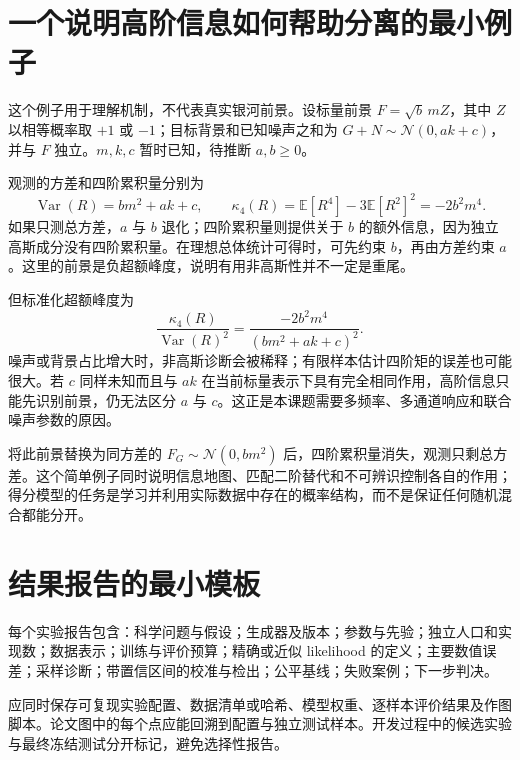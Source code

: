 \documentclass[UTF8,fontset=fandol,a4paper,11pt]{ctexart}
\numberwithin{equation}{section}
\newcommand{\E}{\mathbb E}
\newcommand{\Normal}{\mathcal N}
\begin{document}
\section{一个说明高阶信息如何帮助分离的最小例子}
这个例子用于理解机制，不代表真实银河前景。设标量前景 $F=\sqrt b\,mZ$，其中 $Z$ 以相等概率取 $+1$ 或 $-1$；目标背景和已知噪声之和为 $G+N\sim\Normal(0,ak+c)$，并与 $F$ 独立。$m,k,c$ 暂时已知，待推断 $a,b\geq0$。

观测的方差和四阶累积量分别为
\begin{equation}
\operatorname{Var}(R)=bm^2+ak+c,\qquad
\kappa_4(R)=\E[R^4]-3\E[R^2]^2=-2b^2m^4.
\end{equation}
如果只测总方差，$a$ 与 $b$ 退化；四阶累积量则提供关于 $b$ 的额外信息，因为独立高斯成分没有四阶累积量。在理想总体统计可得时，可先约束 $b$，再由方差约束 $a$。这里的前景是负超额峰度，说明有用非高斯性并不一定是重尾。

但标准化超额峰度为
\begin{equation}
\frac{\kappa_4(R)}{\operatorname{Var}(R)^2}
=\frac{-2b^2m^4}{(bm^2+ak+c)^2}.
\end{equation}
噪声或背景占比增大时，非高斯诊断会被稀释；有限样本估计四阶矩的误差也可能很大。若 $c$ 同样未知而且与 $ak$ 在当前标量表示下具有完全相同作用，高阶信息只能先识别前景，仍无法区分 $a$ 与 $c$。这正是本课题需要多频率、多通道响应和联合噪声参数的原因。

将此前景替换为同方差的 $F_G\sim\Normal(0,bm^2)$ 后，四阶累积量消失，观测只剩总方差。这个简单例子同时说明信息地图、匹配二阶替代和不可辨识控制各自的作用；得分模型的任务是学习并利用实际数据中存在的概率结构，而不是保证任何随机混合都能分开。

\section{结果报告的最小模板}
每个实验报告包含：科学问题与假设；生成器及版本；参数与先验；独立人口和实现数；数据表示；训练与评价预算；精确或近似 likelihood 的定义；主要数值误差；采样诊断；带置信区间的校准与检出；公平基线；失败案例；下一步判决。

应同时保存可复现实验配置、数据清单或哈希、模型权重、逐样本评价结果及作图脚本。论文图中的每个点应能回溯到配置与独立测试样本。开发过程中的候选实验与最终冻结测试分开标记，避免选择性报告。
\end{document}
